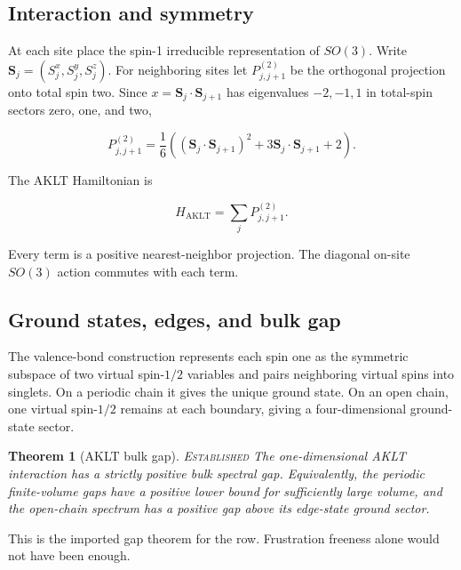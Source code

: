 \documentclass[12pt]{article}
\newtheorem{theorem}{Theorem}[section]
\theoremstyle{definition}
\theoremstyle{remark}
\newcommand{\EST}{\textnormal{\textsc{Established}}}
\begin{document}
\subsection{Interaction and symmetry}

At each site place the spin-1 irreducible representation of $SO(3)$.  Write
$\mathbf S_j=(S_j^x,S_j^y,S_j^z)$.  For neighboring sites let
$P^{(2)}_{j,j+1}$ be the orthogonal projection onto total spin two.  Since
$x=\mathbf S_j\cdot\mathbf S_{j+1}$ has eigenvalues $-2,-1,1$ in total-spin
sectors zero, one, and two,

\begin{equation}
  P^{(2)}_{j,j+1}
  =\frac16\left(
      (\mathbf S_j\cdot\mathbf S_{j+1})^2
      +3\mathbf S_j\cdot\mathbf S_{j+1}
      +2
    \right).
  \label{eq:aklt-projector}
\end{equation}

The AKLT Hamiltonian is

\begin{equation}
  H_{\mathrm{AKLT}}=\sum_j P^{(2)}_{j,j+1}.
  \label{eq:aklt-hamiltonian}
\end{equation}

Every term is a positive nearest-neighbor projection.  The diagonal on-site
$SO(3)$ action commutes with each term.

\subsection{Ground states, edges, and bulk gap}

The valence-bond construction represents each spin one as the symmetric
subspace of two virtual spin-$1/2$ variables and pairs neighboring virtual
spins into singlets.  On a periodic chain it gives the unique ground state.
On an open chain, one virtual spin-$1/2$ remains at each boundary, giving a
four-dimensional ground-state sector.

\begin{theorem}[AKLT bulk gap]
\label{thm:aklt-gap}
\EST{}  The one-dimensional AKLT interaction has a strictly positive bulk
spectral gap.  Equivalently, the periodic finite-volume gaps have a positive
lower bound for sufficiently large volume, and the open-chain spectrum has a
positive gap above its edge-state ground sector.
\end{theorem}

This is the imported gap theorem for the row.  Frustration freeness alone
would not have been enough.
\end{document}
